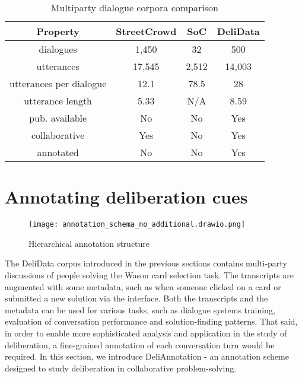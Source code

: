 \documentclass[acmsmall,manuscript,screen]{acmart}
\newcommand\delidata{DeliData }
\begin{document}
\begin{table}[t!]
    \centering
    \begin{tabular}{|c|c|c|c|}
    \hline
    \textbf{Property} 
    & \textbf{StreetCrowd} 
    & \textbf{SoC} 
    & \textbf{\delidata} 
    \\ \hline
       dialogues  & 1,450 & 32 & 500  \\ \hline
       utterances  & 17,545 & 2,512 & 14,003  \\ \hline
    \multicolumn{1}{|p{2cm}|}{\centering utterances per dialogue}  & 12.1 & 78.5 & 28  \\ \hline
    \multicolumn{1}{|p{2cm}|}{\centering utterance length} & 5.33 & N/A & 8.59  \\ \hline
    \multicolumn{1}{|p{2cm}|}{\centering pub. available} & No & No & Yes  \\ \hline
collaborative & Yes & No & Yes  \\ \hline
    annotated & No & No & Yes  \\ \hline
    \end{tabular}
    \caption{Multiparty dialogue corpora comparison}
    \label{table:corpora_comparison}
\end{table}

\section{Annotating deliberation cues}
\label{sec:annotation}

\begin{figure*}[htb!]
\centering
\texttt{[image: annotation\_schema\_no\_additional.drawio.png]}
\caption{Hierarchical annotation structure}
\label{fig:annotation_structure}
\end{figure*}

The DeliData corpus introduced in the previous sections contains multi-party discussions of people solving the Wason card selection task. The transcripts are augmented with some metadata, such as when someone clicked on a card or submitted a new solution via the interface. Both the transcripts and the metadata can be used for various tasks, such as dialogue systems training, evaluation of conversation performance and solution-finding patterns. That said, in order to enable more sophisticated analysis and application in the study of deliberation, a fine-grained annotation of each conversation turn would be required. In this section, we introduce DeliAnnotation - an annotation scheme designed to study deliberation in collaborative problem-solving.
\end{document}
